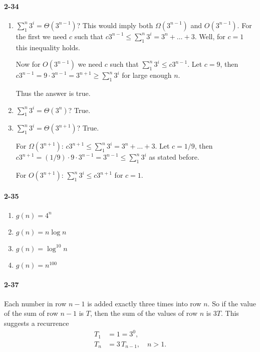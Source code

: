 \documentclass{report}
\begin{document}
\paragraph{2-34}
\begin{enumerate}[label=(\alph*)]
	\item $\sum_1^n 3^i = \Theta(3^{n-1})$? This would imply both $\Omega(3^{n-1})$ and $O(3^{n-1})$. For the first we need $c$ such that $c 3^{n-1} \le \sum_1^n 3^i = 3^n + \ldots + 3$. Well, for $c=1$ this inequality holds.

	Now for $O(3^{n-1})$ we need $c$ such that $\sum_1^n 3^i \le c 3^{n-1}$. Let $c=9$, then $c 3^{n-1} = 9\cdot 3^{n-1} = 3^{n+1} \ge \sum_1^n 3^i$ for large enough $n$.

	Thus the answer is true.

	\item $\sum_1^n 3^i = \Theta(3^n)$? True.
	\item $\sum_1^n 3^i = \Theta(3^{n+1})$? True.

	For $\Omega(3^{n+1})$: $c 3^{n+1} \le \sum_1^n 3^i = 3^n + \ldots + 3$. Let $c=1/9$, then $c 3^{n+1} = (1/9)\cdot9\cdot3^{n-1} = 3^{n-1} \le \sum_1^n 3^i$ as stated before.

	For $O(3^{n+1})$: $\sum_1^n 3^i \le c 3^{n+1}$ for $c=1$.
\end{enumerate}

\paragraph{2-35}
\begin{enumerate}[label=(\alph*)]
	\item $g(n) = 4^n$
	\item $g(n) = n\log n$
	\item $g(n) = \log^{10} n$
	\item $g(n) = n^{100}$
\end{enumerate}

\paragraph{2-37} Each number in row $n-1$ is added exactly three times into row $n$. So if the value of the sum of row $n-1$ is $T$, then the sum of the values of row $n$ is $3T$. This suggests a recurrence
\begin{align*}
	T_1 &= 1 = 3^0, \\
	T_n &= 3\,T_{n-1},\quad n>1.
\end{align*}
\end{document}
